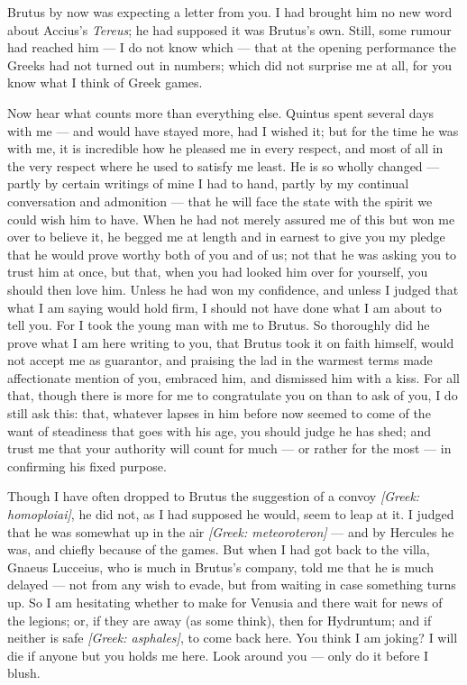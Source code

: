 

 Brutus by now was expecting a letter from you. I had brought him no new word about Accius's \textit{Tereus}; he had supposed it was Brutus's own. Still, some rumour had reached him --- I do not know which --- that at the opening performance the Greeks had not turned out in numbers; which did not surprise me at all, for you know what I think of Greek games.

 Now hear what counts more than everything else. Quintus spent several days with me --- and would have stayed more, had I wished it; but for the time he was with me, it is incredible how he pleased me in every respect, and most of all in the very respect where he used to satisfy me least. He is so wholly changed --- partly by certain writings of mine I had to hand, partly by my continual conversation and admonition --- that he will face the state with the spirit we could wish him to have. When he had not merely assured me of this but won me over to believe it, he begged me at length and in earnest to give you my pledge that he would prove worthy both of you and of us; not that he was asking you to trust him at once, but that, when you had looked him over for yourself, you should then love him. Unless he had won my confidence, and unless I judged that what I am saying would hold firm, I should not have done what I am about to tell you. For I took the young man with me to Brutus. So thoroughly did he prove what I am here writing to you, that Brutus took it on faith himself, would not accept me as guarantor, and praising the lad in the warmest terms made affectionate mention of you, embraced him, and dismissed him with a kiss. For all that, though there is more for me to congratulate you on than to ask of you, I do still ask this: that, whatever lapses in him before now seemed to come of the want of steadiness that goes with his age, you should judge he has shed; and trust me that your authority will count for much --- or rather for the most --- in confirming his fixed purpose.

 Though I have often dropped to Brutus the suggestion of a convoy \textit{[Greek: homoploiai]}, he did not, as I had supposed he would, seem to leap at it. I judged that he was somewhat up in the air \textit{[Greek: meteoroteron]} --- and by Hercules he was, and chiefly because of the games. But when I had got back to the villa, Gnaeus Lucceius, who is much in Brutus's company, told me that he is much delayed --- not from any wish to evade, but from waiting in case something turns up. So I am hesitating whether to make for Venusia and there wait for news of the legions; or, if they are away (as some think), then for Hydruntum; and if neither is safe \textit{[Greek: asphales]}, to come back here. You think I am joking? I will die if anyone but you holds me here. Look around you --- only do it before I blush.

